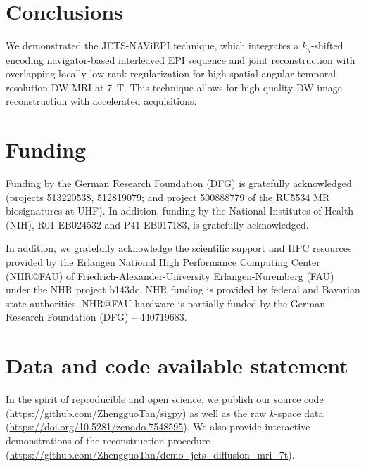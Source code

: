 \documentclass[preprint,12pt,authoryear,review]{elsarticle}
\begin{document}
    \section{Conclusions}
    \label{SEC:Conc}

    We demonstrated the JETS-NAViEPI technique, which integrates
    a $k_y$-shifted encoding navigator-based interleaved EPI sequence
    and joint reconstruction with overlapping locally low-rank regularization
    for high spatial-angular-temporal resolution DW-MRI at \SI{7}{\tesla}.
    This technique allows for high-quality DW image reconstruction
    with accelerated acquisitions.

    \section*{Funding}

    Funding by the German Research Foundation (DFG)
    is gratefully acknowledged
    (projects 513220538, 512819079;
    and project 500888779 of the RU5534 MR biosignatures at UHF).
    In addition, funding by the National Institutes of Health (NIH),
    R01 EB024532 and P41 EB017183, is gratefully acknowledged.

    In addition, we gratefully acknowledge the scientific support and HPC resources
    provided by the Erlangen National High Performance Computing Center (NHR@FAU)
    of Friedrich-Alexander-University Erlangen-Nuremberg (FAU)
    under the NHR project b143dc.
    NHR funding is provided by federal and Bavarian state authorities.
    NHR@FAU hardware is partially funded by the German Research Foundation (DFG) -- 440719683.

    \section*{Data and code available statement}

    In the spirit of reproducible and open science,
    we publish our source code
    (\url{https://github.com/ZhengguoTan/sigpy})
    as well as the raw $k$-space data
    (\url{https://doi.org/10.5281/zenodo.7548595}).
    We also provide interactive demonstrations
    of the reconstruction procedure
    (\url{https://github.com/ZhengguoTan/demo_jets_diffusion_mri_7t}).
\end{document}
